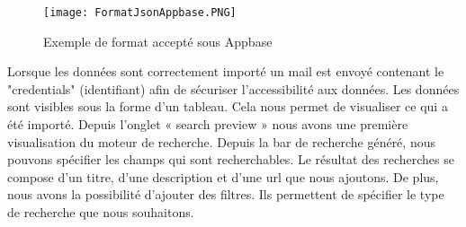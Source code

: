 \begin{figure}[h!]
  \centering
	\texttt{[image: FormatJsonAppbase.PNG]}
	\caption[]{Exemple de format accepté sous Appbase}
  \label{}
\end{figure}

Lorsque les données sont correctement importé un mail est envoyé contenant le "credentials" (identifiant) afin de sécuriser l'accessibilité aux données. 
Les données sont visibles sous la forme d'un tableau. Cela nous permet de visualiser ce qui a été importé. 
Depuis l'onglet « search preview » nous avons une première visualisation du moteur de recherche. Depuis la bar de recherche généré, nous pouvons spécifier les champs qui sont recherchables. Le résultat des recherches se compose d'un titre, d'une description et d'une url que nous ajoutons. De plus, nous avons la possibilité d'ajouter des filtres. Ils permettent de spécifier le type de recherche que nous souhaitons.
